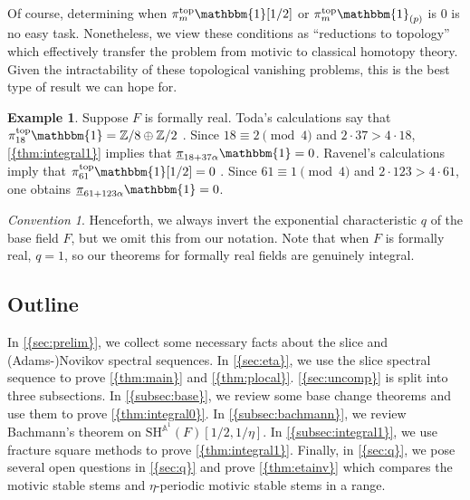 \documentclass[10pt]{amsart}
\numberwithin{equation}{section}
\theoremstyle{plain}
\theoremstyle{definition}
\newtheorem{example}[example]{Example}
\theoremstyle{remark}
\newtheorem{convention}[convention]{Convention}
\begin{document}
Of course, determining when $\pi_m^{{\mathrm{top}}} {\mathbbm{1}}[1/2]$ or $\pi_m^{{\mathrm{top}}} {\mathbbm{1}}_{(p)}$ is $0$ is no easy task.  Nonetheless, we view these conditions as ``reductions to topology'' which effectively transfer the problem from motivic to classical homotopy theory.  Given the intractability of these topological vanishing problems, this is the best type of result we can hope for.

\begin{example}\label{ex:explicit-vanishing}
  Suppose $F$ is formally real.  Toda's calculations say that $\pi_{18}^{{\mathrm{top}}} {\mathbbm{1}} = {\mathbb{Z}}/8\oplus {\mathbb{Z}}/2$ \cite[p.188]{toda}.
  Since $18\equiv 2 \pmod 4$ and $2\cdot 37>4\cdot 18$, {\autoref{{thm:integral1}}} implies that ${\underline{\smash{\pi}}}_{18+37\alpha}{\mathbbm{1}} = 0$. 
  Ravenel's calculations imply that $\pi_{61}^{{\mathrm{top}}} {\mathbbm{1}}[1/2] = 0$ \cite[Theorem 1.1.13, A3.4, A3.5, Theorem 4.4.20]{ravenel}. Since $61\equiv 1 \pmod 4$
  and $2\cdot 123 > 4\cdot 61$, one obtains ${\underline{\smash{\pi}}}_{61+123\alpha}{\mathbbm{1}} =0$.
\end{example}

\begin{convention}
Henceforth, we always invert the exponential characteristic $q$ of the base field $F$, but we omit this from our notation.  Note that when $F$ is formally real, $q=1$, so our theorems for formally real fields are genuinely integral.
\end{convention}

\subsection*{Outline}
In {\autoref{{sec:prelim}}}, we collect some necessary facts about the slice and (Adams-)Novikov spectral sequences.  In {\autoref{{sec:eta}}}, we use the slice spectral sequence to prove {\autoref{{thm:main}}} and {\autoref{{thm:plocal}}}.  {\autoref{{sec:uncomp}}} is split into three subsections.  In {\autoref{{subsec:base}}}, we review some base change theorems and use them to prove {\autoref{{thm:integral0}}}.  In {\autoref{{subsec:bachmann}}}, we review Bachmann's theorem on ${\mathrm{SH}^{{\mathbb{A}}^1}\!}(F)[1/2,1/\eta]$.  In {\autoref{{subsec:integral1}}}, we use fracture square methods to prove {\autoref{{thm:integral1}}}.  Finally, in {\autoref{{sec:q}}}, we pose several open questions in {\autoref{{sec:q}}} and prove {\autoref{{thm:etainv}}} which compares the motivic stable stems and $\eta$-periodic motivic stable stems in a range.
\end{document}
